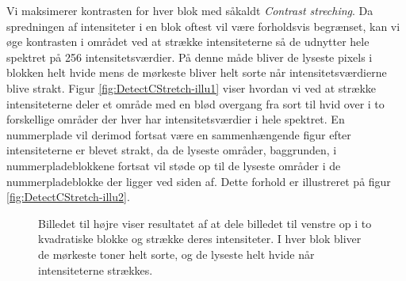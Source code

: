 Vi maksimerer kontrasten for hver blok med såkaldt \textit{Contrast streching}. Da spredningen af intensiteter i en blok oftest vil være forholdsvis begrænset, kan vi øge kontrasten i området ved at strække intensiteterne så de udnytter hele spektret på 256 intensitetsværdier. På denne måde bliver de lyseste pixels i blokken helt hvide  mens de mørkeste bliver helt sorte når intensitetsværdierne blive strakt. Figur \vref{fig:DetectCStretch-illu1} viser hvordan vi ved at strække intensiteterne deler et område med en blød overgang fra sort til hvid over i to forskellige områder der hver har intensitetsværdier i hele spektret. En nummerplade vil derimod fortsat være en sammenhængende figur efter intensiteterne er blevet strakt, da de lyseste områder, baggrunden, i nummerpladeblokkene fortsat vil støde op til de lyseste områder i de nummerpladeblokke der ligger ved siden af. Dette forhold er illustreret på figur \vref{fig:DetectCStretch-illu2}.


\begin{figure}[htbp]
  \centering
  \begin{minipage}[b]{5 cm}
  \end{minipage}
  \begin{minipage}[b]{5 cm}
  \end{minipage}
  \caption{Billedet til højre viser resultatet af at dele billedet til venstre op i to kvadratiske blokke og strække deres intensiteter. I hver blok bliver de mørkeste toner helt sorte, og de lyseste helt hvide når intensiteterne strækkes.}
  \label{fig:DetectCStretch-illu1}
\end{figure}

